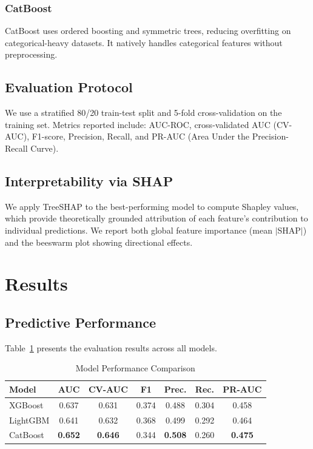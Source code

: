\documentclass[conference]{IEEEtran}
\begin{document}
\subsubsection{CatBoost}
CatBoost \cite{prokhorenkova2018} uses ordered boosting and symmetric trees, reducing overfitting on categorical-heavy datasets. It natively handles categorical features without preprocessing.

\subsection{Evaluation Protocol}

We use a stratified 80/20 train-test split and 5-fold cross-validation on the training set. Metrics reported include: AUC-ROC, cross-validated AUC (CV-AUC), F1-score, Precision, Recall, and PR-AUC (Area Under the Precision-Recall Curve).

\subsection{Interpretability via SHAP}

We apply TreeSHAP \cite{lundberg2020} to the best-performing model to compute Shapley values, which provide theoretically grounded attribution of each feature's contribution to individual predictions. We report both global feature importance (mean $|$SHAP$|$) and the beeswarm plot showing directional effects.

\section{Results}
\label{sec:results}

\subsection{Predictive Performance}

Table~\ref{tab:results} presents the evaluation results across all models.

\begin{table}[h]
\caption{Model Performance Comparison}
\label{tab:results}
\centering
\begin{tabular}{lcccccc}
\toprule
\textbf{Model} & \textbf{AUC} & \textbf{CV-AUC} & \textbf{F1} & \textbf{Prec.} & \textbf{Rec.} & \textbf{PR-AUC} \\
\midrule
XGBoost   & 0.637 & 0.631 & 0.374 & 0.488 & 0.304 & 0.458 \\
LightGBM  & 0.641 & 0.632 & 0.368 & 0.499 & 0.292 & 0.464 \\
CatBoost  & \textbf{0.652} & \textbf{0.646} & 0.344 & \textbf{0.508} & 0.260 & \textbf{0.475} \\
\bottomrule
\end{tabular}
\end{table}
\end{document}
